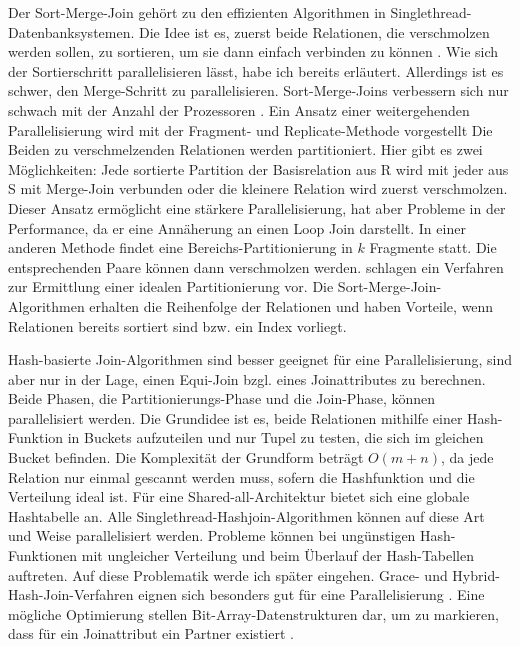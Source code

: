\documentclass[a4paper,12pt,twoside]{article}
\begin{document}
{Der Sort-Merge-Join gehört zu den effizienten Algorithmen in Singlethread-Datenbanksystemen. Die Idee ist es, zuerst beide Relationen, die verschmolzen werden sollen, zu sortieren, um sie dann einfach verbinden zu können \parencite[S. 149]{Lu1994}. Wie sich der Sortierschritt parallelisieren lässt, habe ich bereits erläutert. Allerdings ist es schwer, den Merge-Schritt zu parallelisieren. Sort-Merge-Joins verbessern sich nur schwach mit der Anzahl der Prozessoren \parencite{Yu1998}. Ein Ansatz einer weitergehenden Parallelisierung wird mit der Fragment- und Replicate-Methode vorgestellt \parencite {Richardson1987} Die Beiden zu verschmelzenden Relationen werden partitioniert. Hier gibt es zwei Möglichkeiten: Jede sortierte Partition der Basisrelation aus R wird mit jeder aus S mit Merge-Join verbunden oder die kleinere Relation wird zuerst verschmolzen. Dieser Ansatz ermöglicht eine stärkere Parallelisierung, hat aber Probleme in der Performance, da er eine Annäherung an einen Loop Join darstellt. In einer anderen Methode findet eine Bereichs-Partitionierung in $k$ Fragmente statt. Die entsprechenden Paare können dann verschmolzen werden. \textcite{Iyer1989} schlagen ein Verfahren zur Ermittlung einer idealen Partitionierung vor. Die Sort-Merge-Join-Algorithmen erhalten die Reihenfolge der Relationen und haben Vorteile, wenn Relationen bereits sortiert sind bzw. ein Index vorliegt.

Hash-basierte Join-Algorithmen sind besser geeignet für eine Parallelisierung, sind aber nur in der Lage, einen Equi-Join bzgl. eines Joinattributes zu berechnen. Beide Phasen, die Partitionierungs-Phase und die Join-Phase, können parallelisiert werden. Die Grundidee ist es, beide Relationen mithilfe einer Hash-Funktion in Buckets aufzuteilen und nur Tupel zu testen, die sich im gleichen Bucket befinden. Die Komplexität der Grundform beträgt $O(m + n)$, da jede Relation nur einmal gescannt werden muss, sofern die Hashfunktion und die Verteilung ideal ist. Für eine Shared-all-Architektur bietet sich eine globale Hashtabelle an. Alle Singlethread-Hashjoin-Algorithmen können auf diese Art und Weise parallelisiert werden. Probleme können bei ungünstigen Hash-Funktionen mit ungleicher Verteilung und beim Überlauf der Hash-Tabellen auftreten. Auf diese Problematik werde ich später eingehen. Grace- und Hybrid-Hash-Join-Verfahren eignen sich besonders gut für eine Parallelisierung \parencite{DeWitt1985}. Eine mögliche Optimierung stellen Bit-Array-Datenstrukturen dar, um zu markieren, dass für ein Joinattribut ein Partner existiert \parencite{Valduriez1984}.

}
\end{document}
